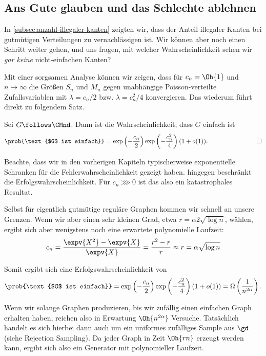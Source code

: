 \subsection{Ans Gute glauben und das Schlechte ablehnen}
In \cref{subsec:anzahl-illegaler-kanten} zeigten wir, dass der Anteil illegaler Kanten bei gutmütigen Verteilungen zu vernachlässigen ist.
Wir können aber noch einen Schritt weiter gehen, und uns fragen, mit welcher Wahrscheinlichkeit sehen wir \emph{gar keine} nicht-einfachen Kanten?

Mit einer sorgsamen Analyse können wir zeigen, dass für $c_n = \Oh{1}$ und $n \to \infty$ die Größen $S_n$ und $M_n$ gegen unabhängige Poisson-verteilte Zufallsvariablen mit $\lambda = c_n/2$ bzw. $\lambda = c_n^2/4$ konvergieren.
Das wiederum führt direkt zu folgendem Satz.

\begin{theorem}\label{thm:einfaches_cm}
    Sei $G \follows \CMnd$. Dann ist die Wahrscheinlichkeit, dass $G$ einfach ist
    \begin{align}
        \prob{\text{$G$ ist einfach}} = \exp\left(-\frac{c_n}{2}\right)\exp\left(-\frac{c_n^2}{4}\right)(1 + o(1)). \hspace{2cm}\qedhere
    \end{align}
\end{theorem}

Beachte, dass wir in den vorherigen Kapiteln typischerweise exponentielle Schranken für die Fehlerwahrscheinlichkeit gezeigt haben.
 hingegen beschränkt die Erfolgswahrscheinlichkeit.
Für $c_n \ggg 0$ ist das also ein katastrophales Resultat.

Selbst für eigentlich gutmütige reguläre Graphen kommen wir schnell an unsere Grenzen.
Wenn wir aber einen sehr kleinen Grad, etwa $r = \alpha 2 \sqrt{\log{n}}$, wählen, ergibt sich aber wenigstens noch eine erwartete polynomielle Laufzeit:
\begin{align}
    c_n = \frac{\expv{X^2} - \expv{X}}{\expv{X}} = \frac{r^2 - r}{r} \approx r = \alpha\sqrt{\log n}
\end{align}

\noindent
Somit ergibt sich eine Erfolgswahrscheinlichkeit von
\begin{align}
    \prob{\text{$G$ ist einfach}}
    = \exp\left(-\frac{c_n}{2}\right)\exp\left(-\frac{c_n^2}{4}\right)(1 + o(1))
    = \Omega\left(\frac{1}{n^{2\alpha}}\right).
\end{align}

Wenn wir solange Graphen produzieren, bis wir zufällig einen einfachen Graph erhalten haben, reichen also in Erwartung $\Oh{n^{2\alpha}}$ Versuche.
Tatsächlich handelt es sich hierbei dann auch um ein uniformes zufälliges Sample aus $\gd$ (siehe Rejection Sampling).
Da jeder Graph in Zeit $\Oh{rn}$ erzeugt werden kann, ergibt sich also ein Generator mit polynomieller Laufzeit.

